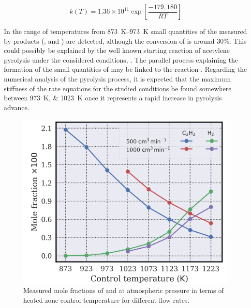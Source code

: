 \documentclass[final,3p,times,twocolumn,sort&compress]{elsarticle}
\begin{document}
\begin{equation}
	k(T) = 1.36\times{}10^{11}\exp\left[\frac{-179,180}{RT}\right]
	\label{equ:acetylene-global rate}
\end{equation}

In the range of temperatures from \SIrange{873}{973}{\kelvin} small quantities of the measured by-products (,  and ) are detected, although the conversion of  is around 30\%. This could possibly be explained by the well known starting reaction of acetylene pyrolysis under the considered conditions, . The parallel process explaining the formation of the small quantities of  may be linked to the reaction . Regarding the numerical analysis of the pyrolysis process, it is expected that the maximum stiffness of the rate equations for the studied conditions be found somewhere between \SIlist{973;1023}{\kelvin} once it represents a rapid increase in pyrolysis advance.


\begin{figure}[h]
	\centering
	\includegraphics[width=\linewidth]
	{figures/fractions_atmospheric_pressure_main}
	\caption{\label{fig:fractions-atmospheric-pressure-main}Measured mole fractions of  and  at atmospheric pressure in terms of heated zone control temperature for different flow rates.}
\end{figure}
\end{document}
